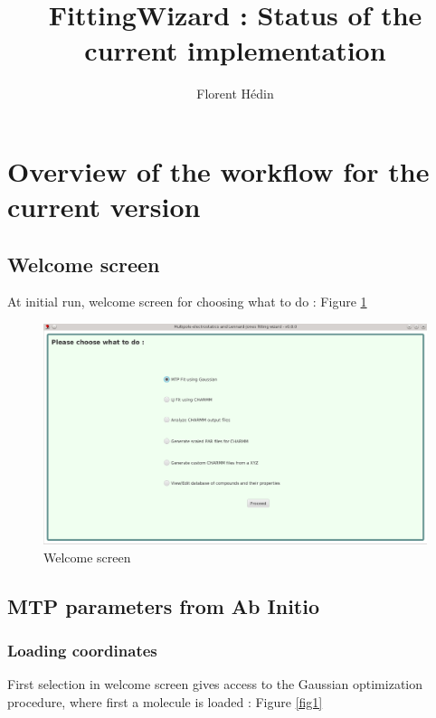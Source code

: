 \documentclass[12pt,a4paper]{article}
\author{Florent H\'{e}din}
\title{FittingWizard : Status of the current implementation}
\begin{document}
\maketitle

\tableofcontents

\section{Overview of the workflow for the current version}

\subsection{Welcome screen}

At initial run, welcome screen for choosing what to do : Figure \ref{fig0} \\


\begin{figure}[h!]
\centering
\includegraphics[width=0.9\linewidth]{pics/scr0}
\caption{Welcome screen}
\label{fig0}
\end{figure}

\subsection{MTP parameters from Ab Initio}

\subsubsection{Loading coordinates}

First selection in welcome screen gives access to the Gaussian optimization procedure, where first 
a molecule 
is loaded : Figure \ref{fig1} \\

\end{document}
